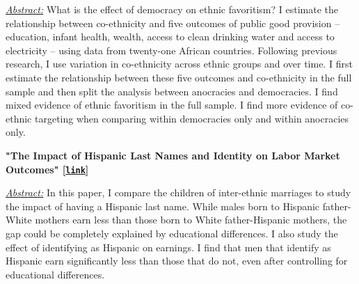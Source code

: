 \documentclass[10pt,letterpaper]{article}
\renewenvironment{itemize}{
  \begin{list}{}{
    \setlength{\leftmargin}{1.5em}
  }
}{
  \end{list}
}
\begin{document}
\begin{itemize}
\underline{\textit{Abstract:}} What is the effect of democracy on ethnic favoritism? I estimate the relationship between co-ethnicity and five outcomes of public good provision – education, infant health, wealth, access to clean drinking water and access to electricity – using data from twenty-one African countries. Following previous research, I use variation in co-ethnicity across ethnic groups and over time. I first estimate the relationship between these five outcomes and co-ethnicity in the full sample and then split the analysis between anocracies and democracies. I find mixed evidence of ethnic favoritism in the full sample. I find more evidence of co-ethnic targeting when comparing within democracies only and within anocracies only.

\bigskip

\item \textbf{"The Impact of Hispanic Last Names and Identity on Labor Market Outcomes" [\href{https://hhadah.github.io/hispanic-last-names/my_paper/Hadah-last-names.pdf}{\tt link}]}

\bigskip

\underline{\textit{Abstract:}} In this paper, I compare the children of inter-ethnic marriages to study the impact of having a Hispanic last name. While males born to Hispanic father-White mothers earn less than those born to White father-Hispanic mothers, the gap could be completely explained by educational differences. I also study the effect of identifying as Hispanic on earnings. I find that men that identify as Hispanic earn significantly less than those that do not, even after controlling for educational differences.

\end{itemize}
\end{document}
